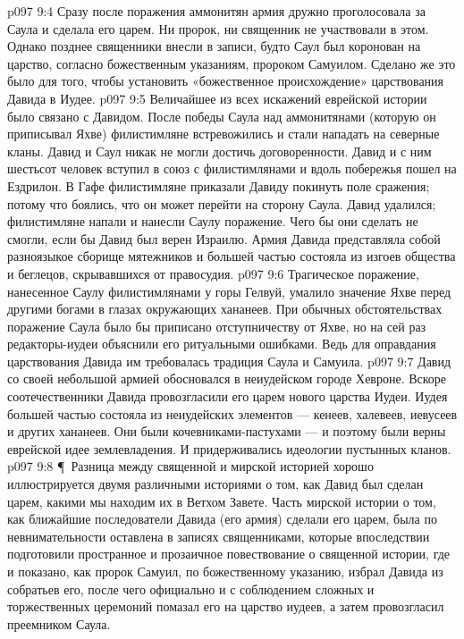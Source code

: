 \vs p097 9:4 Сразу после поражения аммонитян армия дружно проголосовала за Саула и сделала его царем. Ни пророк, ни священник не участвовали в этом. Однако позднее священники внесли в записи, будто Саул был коронован на царство, согласно божественным указаниям, пророком Самуилом. Сделано же это было для того, чтобы установить «божественное происхождение» царствования Давида в Иудее.
\vs p097 9:5 Величайшее из всех искажений еврейской истории было связано с Давидом. После победы Саула над аммонитянами (которую он приписывал Яхве) филистимляне встревожились и стали нападать на северные кланы. Давид и Саул никак не могли достичь договоренности. Давид и с ним шестьсот человек вступил в союз с филистимлянами и вдоль побережья пошел на Ездрилон. В Гафе филистимляне приказали Давиду покинуть поле сражения; потому что боялись, что он может перейти на сторону Саула. Давид удалился; филистимляне напали и нанесли Саулу поражение. Чего бы они сделать не смогли, если бы Давид был верен Израилю. Армия Давида представляла собой разноязыкое сборище мятежников и большей частью состояла из изгоев общества и беглецов, скрывавшихся от правосудия.
\vs p097 9:6 Трагическое поражение, нанесенное Саулу филистимлянами у горы Гелвуй, умалило значение Яхве перед другими богами в глазах окружающих хананеев. При обычных обстоятельствах поражение Саула было бы приписано отступничеству от Яхве, но на сей раз редакторы\hyp{}иудеи объяснили его ритуальными ошибками. Ведь для оправдания царствования Давида им требовалась традиция Саула и Самуила.
\vs p097 9:7 Давид со своей небольшой армией обосновался в неиудейском городе Хевроне. Вскоре соотечественники Давида провозгласили его царем нового царства Иудеи. Иудея большей частью состояла из неиудейских элементов --- кенеев, халевеев, иевусеев и других хананеев. Они были кочевниками\hyp{}пастухами --- и поэтому были верны еврейской идее землевладения. И придерживались идеологии пустынных кланов.
\vs p097 9:8 \P\ Разница между священной и мирской историей хорошо иллюстрируется двумя различными историями о том, как Давид был сделан царем, какими мы находим их в Ветхом Завете. Часть мирской истории о том, как ближайшие последователи Давида (его армия) сделали его царем, была по невнимательности оставлена в записях священниками, которые впоследствии подготовили пространное и прозаичное повествование о священной истории, где и показано, как пророк Самуил, по божественному указанию, избрал Давида из собратьев его, после чего официально и с соблюдением сложных и торжественных церемоний помазал его на царство иудеев, а затем провозгласил преемником Саула.
